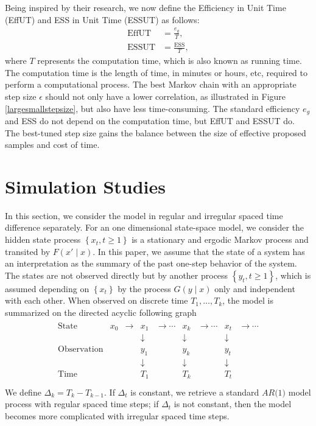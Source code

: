 Being inspired by their research, we now define the Efficiency in Unit Time (EffUT)  and ESS in Unit Time (ESSUT) as follows: 
\begin{align}
\mbox{EffUT}   &= \frac{e_g}{T},\\
\mbox{ESSUT} &= \frac{\mbox{ESS}}{T},
\end{align} 
where $T$ represents the computation time, which is also known as running time. The computation time is the length of time, in minutes or hours, etc, required to perform a computational process. The best Markov chain with an appropriate step size $\epsilon$ should not only have a lower correlation, as illustrated in Figure \ref{largesmallstepsize}, but also have less time-consuming. The standard efficiency $e_g$ and ESS do not depend on the computation time, but EffUT and ESSUT do. The best-tuned step size gains the balance between the size of effective proposed samples and cost of time. 




\section{Simulation Studies}

In this section, we consider the model in regular and irregular spaced time difference separately. For an one dimensional state-space model, we consider the hidden state process $\left\lbrace x_t, t\geq 1\right\rbrace$ is a stationary and ergodic Markov process and transited by $F(x'\mid x)$. In this paper, we assume that the state of a system has an interpretation as the summary of the past one-step behavior of the system. The states are not observed directly but by another process $\left\lbrace y_t, t\geq 1\right\rbrace$, which is assumed depending on $\left\lbrace x_t\right\rbrace$ by the process $G(y\mid x)$ only and independent with each other. When observed on discrete time $T_1,\ldots,T_k$, the model is summarized on the directed acyclic following graph  
\begin{align*}
\begin{matrix}
\mbox{State}  & x_0     &  \rightarrow& x_1   & \rightarrow \cdots  & x_k  & \rightarrow \cdots & x_t & \rightarrow \cdots\\
          & &       & \downarrow &         &\downarrow &        &\downarrow &   \\
\mbox{Observation}& && y_1               &          & y_k               &        & y_t               &   \\
          & &      & \downarrow &          &\downarrow  &        &\downarrow &   \\
\mbox{Time } & &       & T_1               &          & T_k               &        & T_t               &   \\
\end{matrix}
\end{align*}
We define $\Delta_k = T_k-T_{k-1}$. If $\Delta_t$ is constant, we retrieve a standard  $\textit{AR(1)}$ model process with regular spaced time steps; if $\Delta_t$ is not constant, then the model becomes more complicated with irregular spaced time steps. 

